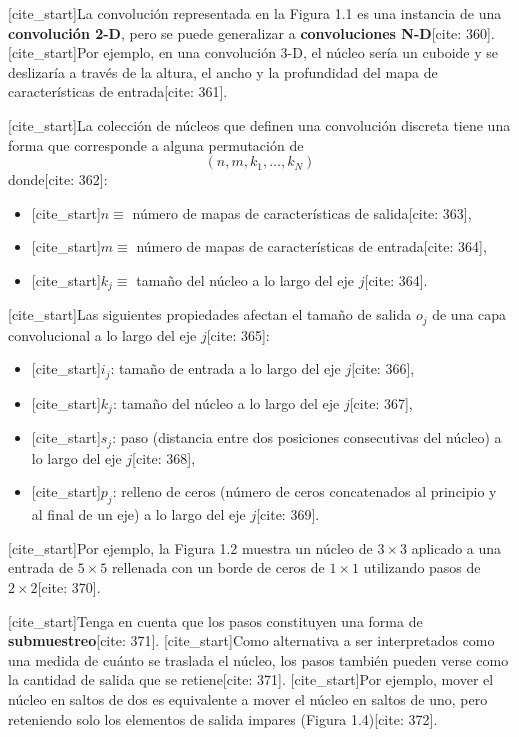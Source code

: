 \documentclass[
  super,
  preprint,
  3p]{elsarticle}
\providecommand{\tightlist}{%
  \setlength{\itemsep}{0pt}\setlength{\parskip}{0pt}}\usepackage{longtable,booktabs,array}
\begin{document}
{[}cite\_start{]}La convolución representada en la Figura 1.1 es una
instancia de una \textbf{convolución 2-D}, pero se puede generalizar a
\textbf{convoluciones N-D}{[}cite: 360{]}. {[}cite\_start{]}Por ejemplo,
en una convolución 3-D, el núcleo sería un cuboide y se deslizaría a
través de la altura, el ancho y la profundidad del mapa de
características de entrada{[}cite: 361{]}.

{[}cite\_start{]}La colección de núcleos que definen una convolución
discreta tiene una forma que corresponde a alguna permutación de
\[(n, m, k_1, \dots, k_N)\] donde{[}cite: 362{]}:

\begin{itemize}
\tightlist
\item
  {[}cite\_start{]}\(n \equiv\) número de mapas de características de
  salida{[}cite: 363{]},
\item
  {[}cite\_start{]}\(m \equiv\) número de mapas de características de
  entrada{[}cite: 364{]},
\item
  {[}cite\_start{]}\(k_j \equiv\) tamaño del núcleo a lo largo del eje
  \(j\){[}cite: 364{]}.
\end{itemize}

{[}cite\_start{]}Las siguientes propiedades afectan el tamaño de salida
\(o_j\) de una capa convolucional a lo largo del eje \(j\){[}cite:
365{]}:

\begin{itemize}
\tightlist
\item
  {[}cite\_start{]}\(i_j\): tamaño de entrada a lo largo del eje
  \(j\){[}cite: 366{]},
\item
  {[}cite\_start{]}\(k_j\): tamaño del núcleo a lo largo del eje
  \(j\){[}cite: 367{]},
\item
  {[}cite\_start{]}\(s_j\): paso (distancia entre dos posiciones
  consecutivas del núcleo) a lo largo del eje \(j\){[}cite: 368{]},
\item
  {[}cite\_start{]}\(p_j\): relleno de ceros (número de ceros
  concatenados al principio y al final de un eje) a lo largo del eje
  \(j\){[}cite: 369{]}.
\end{itemize}

{[}cite\_start{]}Por ejemplo, la Figura 1.2 muestra un núcleo de
\(3 \times 3\) aplicado a una entrada de \(5 \times 5\) rellenada con un
borde de ceros de \(1 \times 1\) utilizando pasos de
\(2 \times 2\){[}cite: 370{]}.

{[}cite\_start{]}Tenga en cuenta que los pasos constituyen una forma de
\textbf{submuestreo}{[}cite: 371{]}. {[}cite\_start{]}Como alternativa a
ser interpretados como una medida de cuánto se traslada el núcleo, los
pasos también pueden verse como la cantidad de salida que se
retiene{[}cite: 371{]}. {[}cite\_start{]}Por ejemplo, mover el núcleo en
saltos de dos es equivalente a mover el núcleo en saltos de uno, pero
reteniendo solo los elementos de salida impares (Figura 1.4){[}cite:
372{]}.
\end{document}
